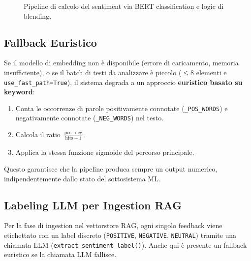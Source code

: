 \begin{figure}[htbp]
    \centering
    \caption{Pipeline di calcolo del sentiment via BERT classification e logic di blending.}
    \label{fig:sentiment-pipeline}
\end{figure}

\subsection{Fallback Euristico}
\label{subsec:sentiment-heuristic}

Se il modello di embedding non è disponibile (errore di caricamento,
memoria insufficiente), o se il batch di testi da analizzare è piccolo
($\leq 8$ elementi e \texttt{use\_fast\_path=True}), il sistema degrada
a un approccio \textbf{euristico basato su keyword}:

\begin{enumerate}
    \item Conta le occorrenze di parole positivamente connotate
        (\texttt{\_POS\_WORDS}) e negativamente connotate
        (\texttt{\_NEG\_WORDS}) nel testo.
    \item Calcola il ratio $\frac{\text{pos} - \text{neg}}{\text{hits}+1}$.
    \item Applica la stessa funzione sigmoide del percorso principale.
\end{enumerate}

Questo garantisce che la pipeline produca sempre un output numerico,
indipendentemente dallo stato del sottosistema ML.

\subsection{Labeling LLM per Ingestion RAG}
\label{subsec:sentiment-llm-label}

Per la fase di ingestion nel vettorstore RAG, ogni singolo feedback
viene etichettato con un label discreto (\texttt{POSITIVE},
\texttt{NEGATIVE}, \texttt{NEUTRAL}) tramite una chiamata LLM
(\texttt{extract\_sentiment\_label()}). Anche qui è presente un
fallback euristico se la chiamata LLM fallisce.

